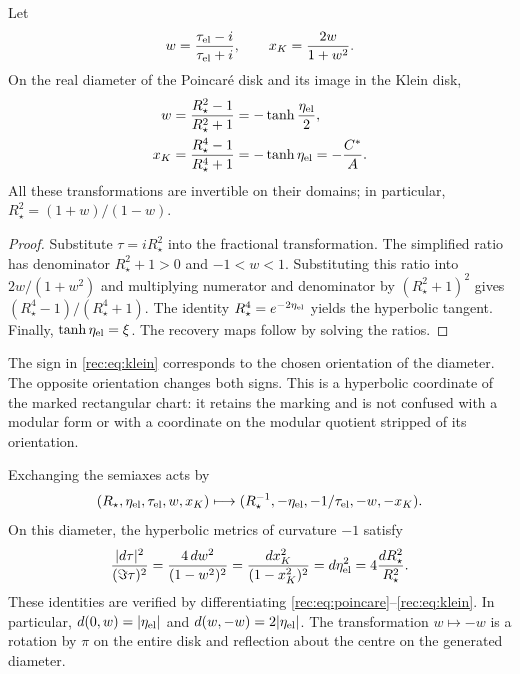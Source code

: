 \begin{theorem}
\label{rec:thm:klein}
Let
\[
 w=\frac{\tau_{\rm el}-i}{\tau_{\rm el}+i},\qquad
 x_K=\frac{2w}{1+w^2}.
\]
On the real diameter of the Poincar\'e disk and its image in the Klein disk,
\begin{align}
 w&=\frac{R_\star^2-1}{R_\star^2+1}
      =-\tanh\frac{\eta_{\rm el}}2,\label{rec:eq:poincare}\\
 x_K&=\frac{R_\star^4-1}{R_\star^4+1}
      =-\tanh\eta_{\rm el}=-\frac{C^*}{A}.\label{rec:eq:klein}
\end{align}
All these transformations are invertible on their domains; in particular,
\(R_\star^2=(1+w)/(1-w)\).
\end{theorem}
\begin{proof}
Substitute \(\tau=iR_\star^2\) into the fractional transformation. The simplified ratio has denominator \(R_\star^2+1>0\) and \(-1<w<1\). Substituting this ratio into \(2w/(1+w^2)\) and multiplying numerator and denominator by \((R_\star^2+1)^2\) gives \((R_\star^4-1)/(R_\star^4+1)\). The identity \(R_\star^4=e^{-2\eta_{\rm el}}\) yields the hyperbolic tangent. Finally, \(\tanh\eta_{\rm el}=\xi\). The recovery maps follow by solving the ratios.
\end{proof}

The sign in \eqref{rec:eq:klein} corresponds to the chosen orientation of the diameter. The opposite orientation changes both signs. This is a hyperbolic coordinate of the marked rectangular chart: it retains the marking and is not confused with a modular form or with a coordinate on the modular quotient stripped of its orientation.

Exchanging the semiaxes acts by
\begin{equation}
 (R_\star,\eta_{\rm el},\tau_{\rm el},w,x_K)
 \longmapsto(R_\star^{-1},-\eta_{\rm el},-1/\tau_{\rm el},-w,-x_K).
 \label{rec:eq:reciproco-radial}
\end{equation}
On this diameter, the hyperbolic metrics of curvature \(-1\) satisfy
\begin{equation}
 \frac{|d\tau|^2}{(\Im\tau)^2}
 =\frac{4\,dw^2}{(1-w^2)^2}
 =\frac{dx_K^2}{(1-x_K^2)^2}
 =d\eta_{\rm el}^2=4\frac{dR_\star^2}{R_\star^2}.
 \label{rec:eq:metricas}
\end{equation}
These identities are verified by differentiating \eqref{rec:eq:poincare}--\eqref{rec:eq:klein}. In particular, \(d(0,w)=|\eta_{\rm el}|\) and \(d(w,-w)=2|\eta_{\rm el}|\). The transformation \(w\mapsto-w\) is a rotation by \(\pi\) on the entire disk and reflection about the centre on the generated diameter.

